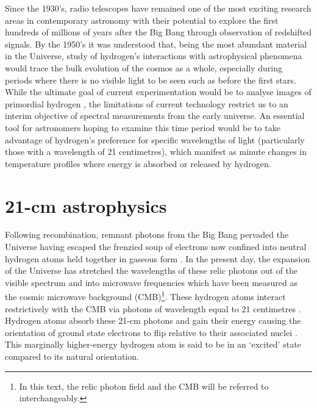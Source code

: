 Since the 1930’s, radio telescopes have remained one of the most exciting research areas in contemporary astronomy with their potential to explore the first hundreds of millions of years after the Big Bang through observation of redshifted signals. By the 1950’s it was understood that, being the most abundant material in the Universe, study of hydrogen’s interactions with astrophysical phenomena would trace the bulk evolution of the cosmos as a whole, especially during periods where there is no visible light to be seen such as before the first stars. While the ultimate goal of current experimentation would be to analyse images of primordial hydrogen \citep{liuData,21in21}, the limitations of current technology restrict us to an interim objective of spectral measurements from the early universe. An essential tool for astronomers hoping to examine this time period would be to take advantage of hydrogen’s preference for specific wavelengths of light (particularly those with a wavelength of 21 centimetres), which manifest as minute changes in temperature profiles where energy is absorbed or released by hydrogen.


\section{21-cm astrophysics}\label{sec:21cm}
Following recombination, remnant photons from the Big Bang pervaded the Universe having escaped the frenzied soup of electrons now confined into neutral hydrogen atoms held together in gaseous form \citep{ryden}. In the present day, the expansion of the Universe has stretched the wavelengths of these relic photons out of the visible spectrum and into microwave frequencies which have been measured as the cosmic microwave background (CMB)\footnote{In this text, the relic photon field and the CMB will be referred to interchangeably.}. These hydrogen atoms interact restrictively with the CMB via photons of wavelength equal to 21 centimetres \citep{lofar}. Hydrogen atoms absorb these 21-cm photons and gain their energy causing the orientation of ground state electrons to flip relative to their associated nuclei \citep{furProbe}. This marginally higher-energy hydrogen atom is said to be in an ‘excited’ state compared to its natural orientation. 

